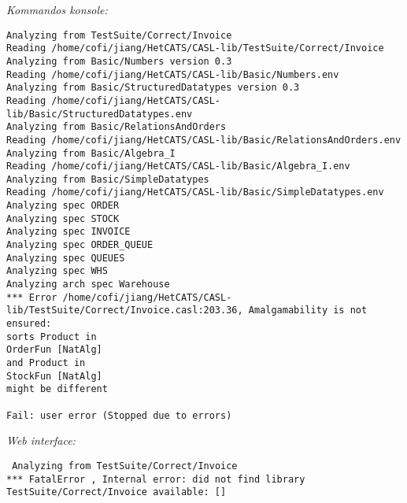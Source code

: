 \documentclass[11pt,a4paper]{article}
\begin{document}
\textit{Kommandos konsole:}
\begin{verbatim}
Analyzing from TestSuite/Correct/Invoice
Reading /home/cofi/jiang/HetCATS/CASL-lib/TestSuite/Correct/Invoice
Analyzing from Basic/Numbers version 0.3
Reading /home/cofi/jiang/HetCATS/CASL-lib/Basic/Numbers.env
Analyzing from Basic/StructuredDatatypes version 0.3
Reading /home/cofi/jiang/HetCATS/CASL-lib/Basic/StructuredDatatypes.env
Analyzing from Basic/RelationsAndOrders
Reading /home/cofi/jiang/HetCATS/CASL-lib/Basic/RelationsAndOrders.env
Analyzing from Basic/Algebra_I
Reading /home/cofi/jiang/HetCATS/CASL-lib/Basic/Algebra_I.env
Analyzing from Basic/SimpleDatatypes
Reading /home/cofi/jiang/HetCATS/CASL-lib/Basic/SimpleDatatypes.env
Analyzing spec ORDER
Analyzing spec STOCK
Analyzing spec INVOICE
Analyzing spec ORDER_QUEUE
Analyzing spec QUEUES
Analyzing spec WHS
Analyzing arch spec Warehouse
*** Error /home/cofi/jiang/HetCATS/CASL-lib/TestSuite/Correct/Invoice.casl:203.36, Amalgamability is not ensured:
sorts Product in
OrderFun [NatAlg]
and Product in
StockFun [NatAlg]
might be different

Fail: user error (Stopped due to errors)
\end{verbatim}
\textit{Web interface:}
\begin{verbatim}
 Analyzing from TestSuite/Correct/Invoice
*** FatalError , Internal error: did not find library TestSuite/Correct/Invoice available: []
\end{verbatim}
\end{document}
